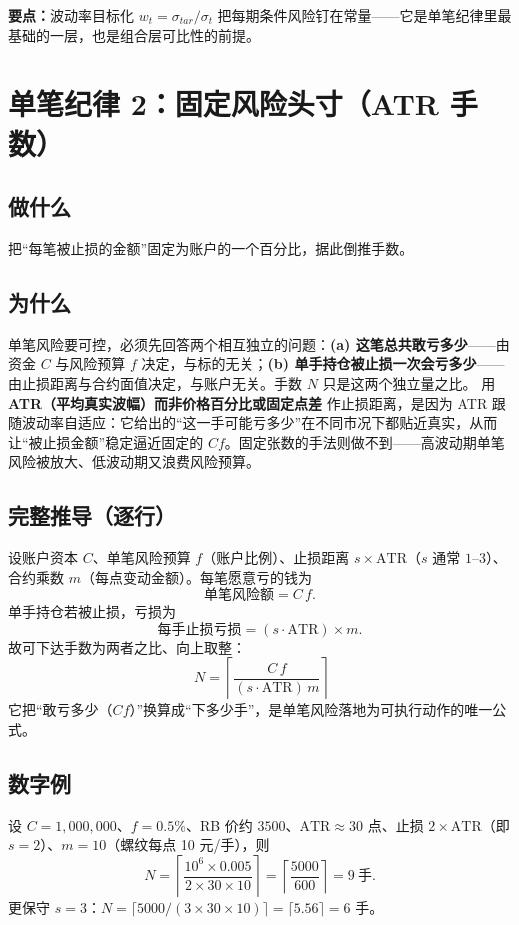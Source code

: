 \documentclass[UTF8,11pt]{ctexart}
\newcommand{\takeaway}[1]{\medskip\par\noindent\textbf{要点：}#1\par\medskip}
\begin{document}
\takeaway{波动率目标化 $w_t=\sigma_{tar}/\sigma_t$ 把每期条件风险钉在常量——它是单笔纪律里最基础的一层，也是组合层可比性的前提。}

\section{单笔纪律 2：固定风险头寸（ATR 手数）}
\subsection{做什么}
把“每笔被止损的金额”固定为账户的一个百分比，据此倒推手数。
\subsection{为什么}
单笔风险要可控，必须先回答两个相互独立的问题：\textbf{(a) 这笔总共敢亏多少}——由资金 $C$ 与风险预算 $f$ 决定，与标的无关；\textbf{(b) 单手持仓被止损一次会亏多少}——由止损距离与合约面值决定，与账户无关。手数 $N$ 只是这两个独立量之比。
用 \textbf{ATR（平均真实波幅）而非价格百分比或固定点差} 作止损距离，是因为 ATR 跟随波动率自适应：它给出的“这一手可能亏多少”在不同市况下都贴近真实，从而让“被止损金额”稳定逼近固定的 $Cf$。固定张数的手法则做不到——高波动期单笔风险被放大、低波动期又浪费风险预算。
\subsection{完整推导（逐行）}
设账户资本 $C$、单笔风险预算 $f$（账户比例）、止损距离 $s\times\text{ATR}$（$s$ 通常 $1$--$3$）、合约乘数 $m$（每点变动金额）。每笔愿意亏的钱为
\begin{equation}
\text{单笔风险额}=C\,f .
\end{equation}
单手持仓若被止损，亏损为
\begin{equation}
\text{每手止损亏损}=(s\cdot\text{ATR})\times m .
\end{equation}
故可下达手数为两者之比、向上取整：
\begin{equation}
\boxed{\; N=\left\lceil \frac{C\,f}{(s\cdot\text{ATR})\,m}\right\rceil }
\end{equation}
它把“敢亏多少（$Cf$）”换算成“下多少手”，是单笔风险落地为可执行动作的唯一公式。
\subsection{数字例}
设 $C=1{,}000{,}000$、$f=0.5\%$、RB 价约 $3500$、$\text{ATR}\approx30$ 点、止损 $2\times\text{ATR}$（即 $s=2$）、$m=10$（螺纹每点 10 元/手），则
\begin{equation}
N=\left\lceil\frac{10^6\times0.005}{2\times30\times10}\right\rceil
=\left\lceil\frac{5000}{600}\right\rceil = 9\ \text{手}.
\end{equation}
更保守 $s=3$：$N=\lceil 5000/(3\times30\times10)\rceil=\lceil 5.56\rceil=6$ 手。
\end{document}
